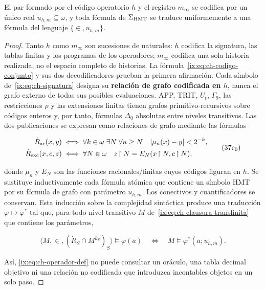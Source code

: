 \begin{lemma}
\label{ix:thm:ch-6}
El par formado por
el código operatorio \(h\) y el registro \(m_\infty\) se codifica por un único
real \(u_{h,m}\subseteq\omega\), y toda fórmula de \(\Sigma_{\rm HMT}\) se
traduce uniformemente a una fórmula del lenguaje \(\{\in,u_{h,m}\}\).

\end{lemma}
\begin{proof}
Tanto \(h\) como \(m_\infty\) son sucesiones de naturales: \(h\)
codifica la signatura, las tablas finitas y los programas de los operadores;
\(m_\infty\) codifica una sola historia realizada, no el espacio completo de
historias. La fórmula~\eqref{ix:eq:ch-codigo-conjunto} y sus dos decodificadores prueban la primera
afirmación. Cada símbolo de~\eqref{ix:eq:ch-signatura} designa su \textbf{relación de grafo codificada en \(h\)}, nunca el grafo externo de todas sus posibles evaluaciones. APP,
TRIT, \(U_t\), \(\Gamma_9\), las restricciones \(\rho\) y las extensiones
finitas tienen grafos primitivo-recursivos sobre códigos enteros y, por tanto,
fórmulas \(\Delta_0\) absolutas entre niveles transitivos. Las dos
publicaciones se expresan como relaciones de grafo mediante las fórmulas

\[
 \begin{aligned}
 \dot R_{\rm ar}(x,y)
 &\;\Longleftrightarrow\;
 \forall k\in\omega\;\exists N\;\forall n\ge N\quad
 |\mu_n(x)-y|<2^{-k},\\
 \dot R_{\rm exc}(x,c,z)
 &\;\Longleftrightarrow\;
 \forall N\in\omega\quad z\!\upharpoonright N
   =E_N(x\!\upharpoonright N,c\!\upharpoonright N),
 \end{aligned}
\tag{37c$_0$}\label{ix:eq:ch-grafos-publicacion}
\]

donde \(\mu_n\) y \(E_N\) son las funciones racionales/finitas cuyos códigos
figuran en \(h\). Se sustituye inductivamente cada fórmula atómica que contiene
un símbolo HMT por su fórmula de grafo con parámetro \(u_{h,m}\). Los
conectivos y cuantificadores se conservan. Esta inducción sobre la complejidad
sintáctica produce una traducción \(\varphi\mapsto\varphi^*\) tal que, para
todo nivel transitivo \(M\) de~\eqref{ix:eq:ch-clausura-transfinita} que contiene los parámetros,

\[
 \langle M,\in,(\dot R_S\cap M^{k_S})_S\rangle
   \models\varphi(\bar a)
 \quad\Longleftrightarrow\quad
 M\models\varphi^*(\bar a;u_{h,m}).
\tag{37c}\label{ix:eq:ch-eliminacion-uniforme}
\]

Así, \eqref{ix:eq:ch-operador-def} no puede consultar un oráculo, una tabla decimal objetivo ni una
relación no codificada que introduzca incontables objetos en un solo paso.
\end{proof}

